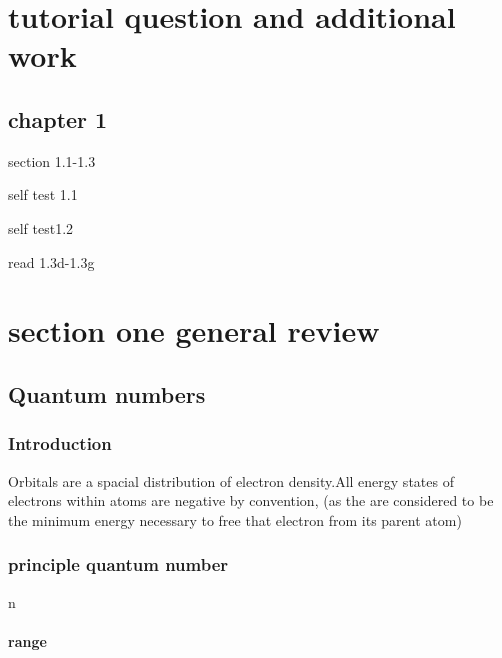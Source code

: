 \documentclass[]{article}
\date{}
\let\oldparagraph\paragraph
\renewcommand{\paragraph}[1]{\oldparagraph{#1}\mbox{}}
\begin{document}
\hypertarget{tutorial-question-and-additional-work}{%
\section{tutorial question and additional
work}\label{tutorial-question-and-additional-work}}

\hypertarget{chapter-1}{%
\subsection{chapter 1}\label{chapter-1}}

section 1.1-1.3

self test 1.1

self test1.2

read 1.3d-1.3g

\hypertarget{section-one-general-review}{%
\section{section one general review}\label{section-one-general-review}}

\hypertarget{quantum-numbers}{%
\subsection{Quantum numbers}\label{quantum-numbers}}

\hypertarget{introduction}{%
\subsubsection{Introduction}\label{introduction}}

Orbitals are a spacial distribution of electron density.All energy
states of electrons within atoms are negative by convention, (as the are
considered to be the minimum energy necessary to free that electron from
its parent atom)

\hypertarget{principle-quantum-number}{%
\subsubsection{principle quantum
number}\label{principle-quantum-number}}

n

\hypertarget{range}{%
\paragraph{range}\label{range}}
\end{document}

